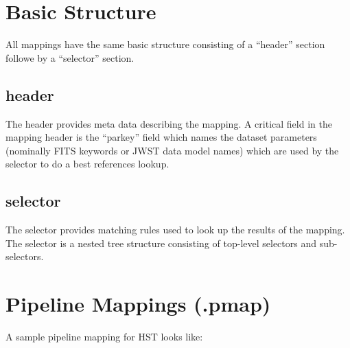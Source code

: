 \documentclass[letterpaper,10pt,english]{sphinxmanual}
\begin{document}
\section{Basic Structure}
\label{rmap_syntax:basic-structure}
All mappings have the same basic structure consisting of a ``header'' section followe by a ``selector'' section.


\subsection{header}
\label{rmap_syntax:header}
The header provides meta data describing the mapping.  A critical field in the mapping header is the ``parkey''
field which names the dataset parameters (nominally FITS keywords or JWST data model names) which are used by
the selector to do a best references lookup.


\subsection{selector}
\label{rmap_syntax:selector}
The selector provides matching rules used to look up the results of the mapping.  The selector is a nested tree
structure consisting of top-level selectors and sub-selectors.


\section{Pipeline Mappings (.pmap)}
\label{rmap_syntax:pipeline-mappings-pmap}
A sample pipeline mapping for HST looks like:
\end{document}
